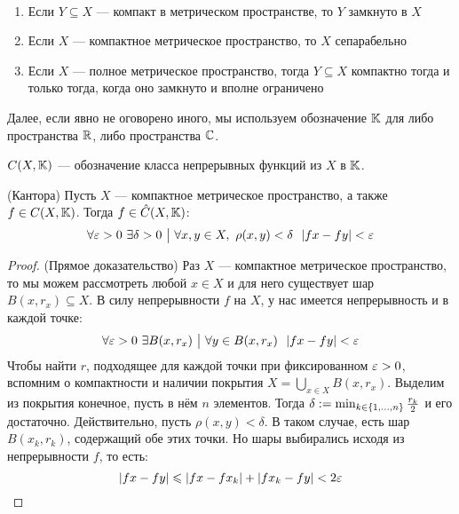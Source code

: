 \begin{exercise}~
	\begin{enumerate}
		\item Если $Y \subseteq X$ --- компакт в метрическом пространстве, то $Y$ замкнуто в $X$
		
		\item Если $X$ --- компактное метрическое пространство, то $X$ сепарабельно
		
		\item Если $X$ --- полное метрическое пространство, тогда $Y \subseteq X$ компактно тогда и только тогда, когда оно замкнуто и вполне ограничено
	\end{enumerate}
\end{exercise}

\begin{note}
	Далее, если явно не оговорено иного, мы используем обозначение $\mathbb{K}$ для либо пространства $\mathbb{R}$, либо пространства $\mathbb{C}$.
\end{note}

\begin{note}
	$C(X, \mathbb{K})$ --- обозначение класса непрерывных функций из $X$ в $\mathbb{K}$.
\end{note}

\begin{theorem} (Кантора)
	Пусть $X$ --- компактное метрическое пространство, а также $f \in C(X, \mathbb{K})$. Тогда $f \in \hat{C}(X, \mathbb{K})$:
	\[
		\forall \varepsilon > 0\ \exists \delta > 0 \ \big|\  \forall x, y \in X,\ \rho(x, y) < \delta\ \ |fx - fy| < \varepsilon
	\]
\end{theorem}

\begin{proof} (Прямое доказательство)
	Раз $X$ --- компактное метрическое пространство, то мы можем рассмотреть любой $x \in X$ и для него существует шар $B(x, r_x) \subseteq X$. В силу непрерывности $f$ на $X$, у нас имеется непрерывность и в каждой точке:
	\[
		\forall \varepsilon > 0\ \exists B(x, r_x) \ \big|\  \forall y \in B(x, r_x)\ \ |fx - fy| < \varepsilon
	\]
	Чтобы найти $r$, подходящее для каждой точки при фиксированном $\varepsilon > 0$, вспомним о компактности и наличии покрытия $X = \bigcup_{x \in X} B(x, r_x)$. Выделим из покрытия конечное, пусть в нём $n$ элементов. Тогда $\delta := \min_{k \in \{1, \ldots, n\}} \frac{r_k}{2}$ и его достаточно. Действительно, пусть $\rho(x, y) < \delta$. В таком случае, есть шар $B(x_k, r_k)$, содержащий обе этих точки. Но шары выбирались исходя из непрерывности $f$, то есть:
	\[
		|fx - fy| \leqslant |fx - fx_k| + |fx_k - fy| < 2\varepsilon
	\]
\end{proof}

